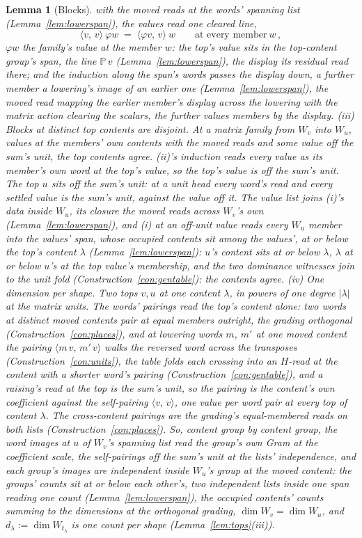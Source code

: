 \documentclass[11pt]{article}
\newtheorem{lemma}{Lemma}
\theoremstyle{definition}
\begin{document}
\begin{lemma}[Blocks]
with the moved reads at the words' spanning list
(Lemma~\ref{lem:lowerspan}), the values read one cleared line,
\[
\langle v,\,v\rangle\ \varphi w\;=\;\langle\varphi v,\,v\rangle\ w
\qquad\text{at every member}\ w\,,
\]
$\varphi w$ the family's value at the member $w$: the top's value
sits in the top-content group's span, the line $\mathbb P\,v$
(Lemma~\ref{lem:lowerspan}), the display its residual read there;
and the induction along the span's words passes the display down,
a further member a lowering's image of an earlier one
(Lemma~\ref{lem:lowerspan}), the moved read mapping the earlier
member's display across the lowering with the matrix action
clearing the scalars, the further values members by the display.
\emph{(iii) Blocks at distinct top contents are disjoint.} At a
matrix family from $W_v$ into $W_u$, values at the members' own
contents with the moved reads and some value off the sum's unit,
the top contents agree. (ii)'s induction reads every value as its
member's own word at the top's value, so the top's value is off
the sum's unit. The top $u$ sits
off the sum's unit: at a unit head every word's read and every
settled value is the sum's unit, against the value off it. The value list
joins (i)'s data inside $W_u$, its closure the moved reads across
$W_v$'s own (Lemma~\ref{lem:lowerspan}), and (i) at an off-unit
value reads every $W_u$ member into the values' span, whose
occupied contents sit among the values', at or below the top's
content $\lambda$
(Lemma~\ref{lem:lowerspan}): $u$'s content sits at or below
$\lambda$, $\lambda$ at or below $u$'s at the top value's
membership, and the two dominance witnesses join to the unit fold
(Construction~\ref{con:gentable}): the contents agree.
\emph{(iv) One dimension per shape.} Two tops $v,u$ at one
content $\lambda$, in powers of one degree $|\lambda|$ at the
matrix units. The words' pairings read the top's content alone:
two words at distinct moved contents pair at equal members
outright, the grading orthogonal
(Construction~\ref{con:places}), and at lowering words $m$, $m'$
at one moved content the pairing
$\langle m\,v,\,m'\,v\rangle$ walks the reversed word across the
transposes (Construction~\ref{con:units}), the table folds each
crossing into an $H$-read at the content with a shorter word's
pairing (Construction~\ref{con:gentable}), and a raising's read
at the top is the sum's unit, so the pairing is the content's
own coefficient against the self-pairing
$\langle v,\,v\rangle$, one value per word pair at every top of
content $\lambda$. The cross-content pairings are the grading's
equal-membered reads on both lists
(Construction~\ref{con:places}). So, content group by content
group, the word images at $u$ of $W_v$'s spanning list read the
group's own Gram at the coefficient scale, the self-pairings off
the sum's unit at the lists' independence, and each group's
images are independent inside $W_u$'s group at the moved
content: the
groups' counts sit at or below each other's, two independent
lists inside one span reading one count
(Lemma~\ref{lem:lowerspan}), the occupied contents' counts
summing to the dimensions at the orthogonal grading,
$\dim W_v=\dim W_u$, and $d_\lambda:=\dim W_{t_\lambda}$ is one
count per shape (Lemma~\ref{lem:tops}(iii)).
\end{lemma}
\end{document}
